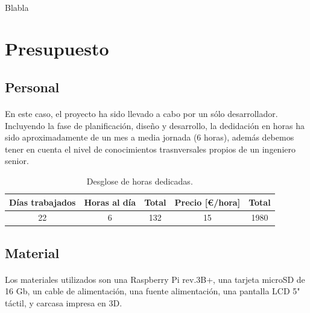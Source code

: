 \paragraph{}Blabla

\section{Presupuesto}

\subsection{Personal}

\paragraph{} En este caso, el proyecto ha sido llevado a cabo por un sólo desarrollador.
Incluyendo la fase de planificación, diseño y desarrollo, la dedidación en horas ha sido
aproximadamente de un mes a media jornada (6 horas), además debemos tener en cuenta el
nivel de conocimientos trasnversales propios de un ingeniero senior.


\begin{table}[hbt]
	\label{t:recursoshumanos}
	\centering
	\begin{tabular}{|c|c|c|c|c|}
		\hline
        \textbf{Días trabajados} & \textbf{Horas al día} & \textbf{Total} & Precio [\euro/hora] & \textbf{Total} \\
		\hline
		22 & 6 & 132 & 15 & 1980 \\
		\hline
	\end{tabular}
	\caption{Desglose de horas dedicadas.}
\end{table}

\subsection{Material}

\paragraph{}Los materiales utilizados son una Raspberry Pi rev.3B+, una tarjeta microSD
de 16 Gb, un cable de alimentación, una fuente alimentación, una pantalla LCD 5" táctil,
y carcasa impresa en 3D.


